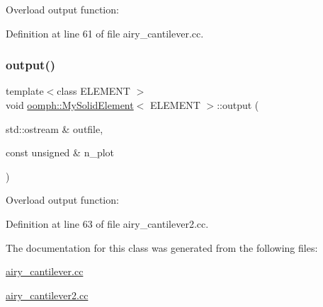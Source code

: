 Overload output function\+: 



Definition at line 61 of file airy\+\_\+cantilever.\+cc.

\mbox{\label{classoomph_1_1MySolidElement_abf5b903419201b1fd6f1587749337650}} 
\subsubsection{\texorpdfstring{output()}{output()}\hspace{0.1cm}{\footnotesize\ttfamily [2/2]}}
{\footnotesize\ttfamily template$<$class E\+L\+E\+M\+E\+NT $>$ \\
void \hyperlink{classoomph_1_1MySolidElement}{oomph\+::\+My\+Solid\+Element}$<$ E\+L\+E\+M\+E\+NT $>$\+::output (\begin{DoxyParamCaption}\item[{std\+::ostream \&}]{outfile,  }\item[{const unsigned \&}]{n\+\_\+plot }\end{DoxyParamCaption})\hspace{0.3cm}{\ttfamily [inline]}}



Overload output function\+: 



Definition at line 63 of file airy\+\_\+cantilever2.\+cc.



The documentation for this class was generated from the following files\+:\begin{DoxyCompactItemize}
\item 
\hyperlink{airy__cantilever_8cc}{airy\+\_\+cantilever.\+cc}\item 
\hyperlink{airy__cantilever2_8cc}{airy\+\_\+cantilever2.\+cc}\end{DoxyCompactItemize}
